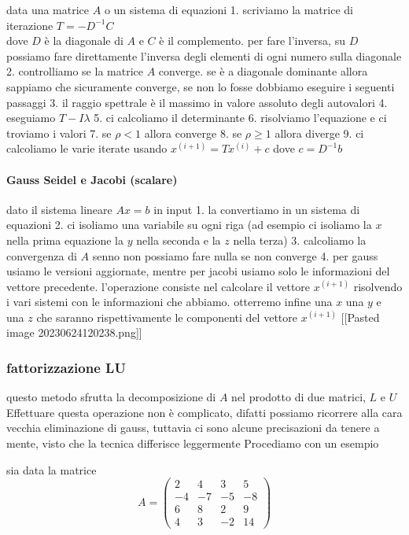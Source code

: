 \documentclass[
]{article}
\begin{document}
data una matrice \(A\) o un sistema di equazioni 1. scriviamo la matrice
di iterazione \(T = -D^{-1}C\)\\
dove \(D\) è la diagonale di \(A\) e \(C\) è il complemento. per fare
l'inversa, su \(D\) possiamo fare direttamente l'inversa degli elementi
di ogni numero sulla diagonale 2. controlliamo se la matrice \(A\)
converge. se è a diagonale dominante allora sappiamo che sicuramente
converge, se non lo fosse dobbiamo eseguire i seguenti passaggi 3. il
raggio spettrale è il massimo in valore assoluto degli autovalori 4.
eseguiamo \(T-I\lambda\) 5. ci calcoliamo il determinante 6. risolviamo
l'equazione e ci troviamo i valori 7. se \(\rho < 1\) allora converge 8.
se \(\rho \geq 1\) allora diverge 9. ci calcoliamo le varie iterate
usando \(x^{(i+1)} = Tx^{(i)}+c\) dove \(c = D^{-1}b\)

\paragraph{Gauss Seidel e Jacobi
(scalare)}\label{gauss-seidel-e-jacobi-scalare}

dato il sistema lineare \(Ax=b\) in input 1. la convertiamo in un
sistema di equazioni 2. ci isoliamo una variabile su ogni riga (ad
esempio ci isoliamo la \(x\) nella prima equazione la \(y\) nella
seconda e la \(z\) nella terza) 3. calcoliamo la convergenza di \(A\)
senno non possiamo fare nulla se non converge 4. per gauss usiamo le
versioni aggiornate, mentre per jacobi usiamo solo le informazioni del
vettore precedente. l'operazione consiste nel calcolare il vettore
\(x^{(i+1)}\) risolvendo i vari sistemi con le informazioni che abbiamo.
otterremo infine una \(x\) una \(y\) e una \(z\) che saranno
rispettivamente le componenti del vettore \(x^{(i+1)}\) {[}{[}Pasted
image 20230624120238.png{]}{]}

\subsubsection{fattorizzazione LU}\label{fattorizzazione-lu}

questo metodo sfrutta la decomposizione di \(A\) nel prodotto di due
matrici, \(L\) e \(U\) Effettuare questa operazione non è complicato,
difatti possiamo ricorrere alla cara vecchia eliminazione di gauss,
tuttavia ci sono alcune precisazioni da tenere a mente, visto che la
tecnica differisce leggermente Procediamo con un esempio

sia data la matrice
\[A=\left(\begin{matrix}2&4&3&5\\ -4&-7&-5&-8\\ 6&8&2&9\\ 4&3&-2&14\end{matrix}\right)\]
\end{document}
